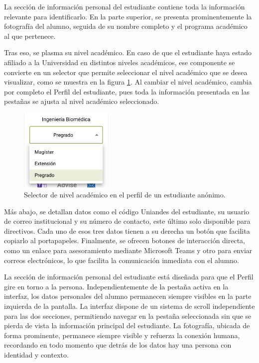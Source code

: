 La sección de información personal del estudiante contiene toda la información relevante para identificarlo. En la parte superior, se presenta prominentemente la fotografía del alumno, seguida de su nombre completo y el programa académico al que pertenece.

Tras eso, se plasma su nivel académico. En caso de que el estudiante haya estado afiliado a la Universidad en distintos niveles académicos, ese componente se convierte en un selector que permite seleccionar el nivel académico que se desea visualizar, como se muestra en la figura \ref{fix:selector}. Al cambiar el nivel académico, cambia por completo el Perfil del estudiante, pues toda la información presentada en las pestañas se ajusta al nivel académico seleccionado.

\begin{figure}[H]
	\centering
	\includegraphics[width=0.4\textwidth]{assets/nes/selector.png}
	\caption{Selector de nivel académico en el perfil de un estudiante anónimo.}
	\label{fix:selector}
\end{figure}

Más abajo, se detallan datos como el código Uniandes del estudiante, su usuario de correo institucional y su número de contacto, este último solo disponible para directivos. Cada uno de esos tres datos tienen a su derecha un botón que facilita copiarlo al portapapeles. Finalmente, se ofrecen botones de interacción directa, como un enlace para asesoramiento mediante Microsoft Teams y otro para enviar correos electrónicos, lo que facilita la comunicación inmediata con el alumno.

La sección de información personal del estudiante está diseñada para que el Perfil gire en torno a la persona. Independientemente de la pestaña activa en la interfaz, los datos personales del alumno permanecen siempre visibles en la parte izquierda de la pantalla. La interfaz dispone de un sistema de scroll independiente para las dos secciones, permitiendo navegar en la pestaña seleccionada sin que se pierda de vista la información principal del estudiante. La fotografía, ubicada de forma prominente, permanece siempre visible y refuerza la conexión humana, recordando en todo momento que detrás de los datos hay una persona con identidad y contexto.

